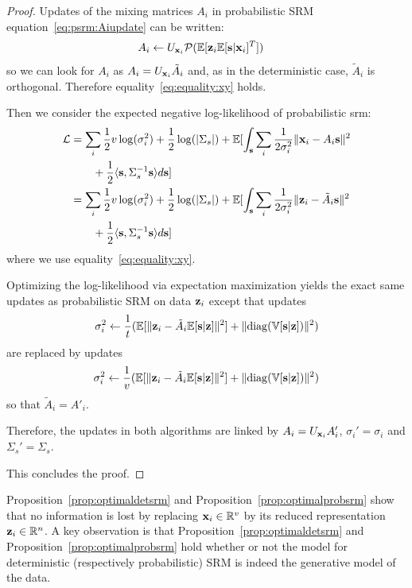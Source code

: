\documentclass{article}
\begin{document}
\begin{proof}
  Updates of the mixing matrices $A_i$ in probabilistic SRM
  equation~\eqref{eq:psrm:Aiupdate} can be written:
  \begin{align}
    A_i &\leftarrow U_{\mathbf{x}_i}\mathcal{P}(\mathbb{E}[\mathbf{z}_i \mathbb{E}[\mathbf{s}| \mathbf{x}_i]^T])
    \label{eq:fastprobsrm:Aiupdate}
  \end{align}
  so we can look for $A_i$ as $A_i = U_{\mathbf{x}_i} \tilde{A}_i$ and, as in the
  deterministic case, $\tilde{A}_i$ is orthogonal.
  Therefore equality~\eqref{eq:equality:xy} holds.
  
  
  Then we consider the expected negative log-likelihood of probabilistic srm:
  \begin{align}
    \mathcal{L} &= \sum_i \frac12 v\log(\sigma_i^2) + \frac12 \log(|\Sigma_s|) + \mathbb{E}[\int_{\mathbf{s}} \sum_i \frac1{2 \sigma_i^{2}} \|\mathbf{x}_i - A_i \mathbf{s} \|^2 \nonumber \\& \enspace \enspace \enspace \enspace+ \frac12 \langle{ \mathbf{s}},{ \Sigma_s^{-1} \mathbf{s} }\rangle  d\mathbf{s}] \\
          &= \sum_i \frac12 v \log(\sigma_i^2) + \frac12 \log(|\Sigma_s|) + \mathbb{E}[\int_{\mathbf{s}} \sum_i \frac1{2 \sigma_i^{2}}\|\mathbf{z}_i - \tilde{A}_i \mathbf{s} \|^2 \nonumber \\& \enspace \enspace \enspace \enspace+ \frac12 \langle{ \mathbf{s}},{ \Sigma_s^{-1} \mathbf{s} }\rangle  d\mathbf{s}]
  \end{align}
  where we use equality~\eqref{eq:equality:xy}.
  
  Optimizing the log-likelihood via expectation maximization yields the exact
  same updates as probabilistic SRM on data $\mathbf{z}_i$
  except that updates
  \begin{align}
    \sigma_i^2 \leftarrow \frac1{t} (\mathbb{E}[\| \mathbf{z}_i - \tilde{A}_i \mathbb{E}[\mathbf{s}|\mathbf{z}]\|^2] + \| {\rm diag}(\mathbb{V}[\mathbf{s} | \mathbf{z}]) \|^2)
  \end{align}
  are replaced by updates
  \begin{align}
    \sigma_i^2 \leftarrow \frac1{v} (\mathbb{E}[\| \mathbf{z}_i - \tilde{A}_i \mathbb{E}[\mathbf{s}|\mathbf{z}]\|^2] + \| {\rm diag}(\mathbb{V}[\mathbf{s} | \mathbf{z}]) \|^2)
  \end{align}
  so that $\tilde{A}_i = A'_i$.
  

  Therefore, the updates in both algorithms are linked  by $A_i = U_{\mathbf{x}_i}A_i'$,
  $\sigma_i' =
  \sigma_i$ and $\Sigma_s'  = \Sigma_s$.
  

  This concludes the proof.
  
\end{proof}

Proposition~\ref{prop:optimaldetsrm} and Proposition~\ref{prop:optimalprobsrm} show that
no information is lost by replacing $\mathbf{x}_i \in \mathbb{R}^v$ by its reduced
representation $\mathbf{z}_i \in \mathbb{R}^n$.
%
A key observation is that Proposition~\ref{prop:optimaldetsrm} and
Proposition~\ref{prop:optimalprobsrm} hold whether or
not the model for deterministic (respectively probabilistic) SRM is indeed the
generative model of the data.
%
\end{document}
